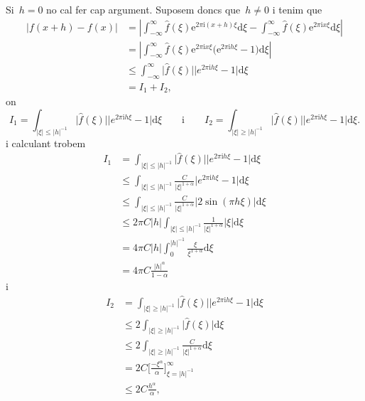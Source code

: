 \documentclass[a4paper]{article}
\theoremstyle{definition}
\newcommand{\iu}{\mathrm{i}}
\newcommand{\e}{\mathrm{e}}
\newcommand{\uppi}{\pi}
\newcommand{\diff}{\mathrm{d}}
\newcommand{\abs}[1]{\lvert{#1}\rvert}
\newcommand{\Abs}[1]{\left\lvert{#1}\right\rvert}
\begin{document}
Si~\(h=0\) no cal fer cap argument.
Suposem doncs que~\(h\neq0\) i tenim que
\begin{align*}
    \abs{f(x+h) - f(x)} &= \Abs{\int_{-\infty}^{\infty}
                           \widehat{f}(\xi)\e^{2\uppi\iu(x+h)\xi}\diff\xi
                         - \int_{-\infty}^{\infty}
                           \widehat{f}(\xi)\e^{2\uppi\iu x\xi}\diff\xi} \\
                        &= \Abs{\int_{-\infty}^{\infty}
                           \widehat{f}(\xi)\e^{2\uppi\iu x\xi}
                           \bigl(\e^{2\uppi\iu h\xi}-1\bigr)
                           \diff\xi} \\
                        &\leq \int_{-\infty}^{\infty}
                           \abs{\widehat{f}(\xi)}\abs{e^{2\uppi\iu h\xi}-1}
                           \diff\xi \\
                        &= I_{1} + I_{2},
\end{align*}
on
\[
    I_{1} = \int_{\abs{\xi}\leq\abs{h}^{-1}}
    \abs{\widehat{f}(\xi)}\abs{e^{2\uppi\iu h\xi}-1} \diff\xi
    \qquad\text{i}\qquad
    I_{2} = \int_{\abs{\xi}\geq\abs{h}^{-1}}
    \abs{\widehat{f}(\xi)}\abs{e^{2\uppi\iu h\xi}-1} \diff\xi.
\]
i calculant trobem
\begin{align*}
    I_{1} &= \int_{\abs{\xi}\leq\abs{h}^{-1}}
             \abs{\widehat{f}(\xi)}\abs{e^{2\uppi\iu h\xi}-1}
             \diff\xi \\
          &\leq \int_{\abs{\xi}\leq\abs{h}^{-1}}
             \frac{C}{\abs{\xi}^{1+\alpha}}
             \abs{e^{2\uppi\iu h\xi}-1}
             \diff\xi \\
          &\leq \int_{\abs{\xi}\leq\abs{h}^{-1}}
             \frac{C}{\abs{\xi}^{1+\alpha}}
             \abs{2\sin(\uppi h\xi)}
             \diff\xi \\
          &\leq 2\uppi C\abs{h}
             \int_{\abs{\xi}\leq\abs{h}^{-1}}
             \frac{1}{\abs{\xi}^{1+\alpha}}\abs{\xi}
             \diff\xi \\
          &= 4\uppi C\abs{h}
             \int_{0}^{\abs{h}^{-1}}
             \frac{\xi}{\xi^{1+\alpha}}
             \diff\xi \\
          &= 4\uppi C\frac{\abs{h}^{\alpha}}{1-\alpha}
\end{align*}
i
\begin{align*}
    I_{2} &= \int_{\abs{\xi}\geq\abs{h}^{-1}}
             \abs{\widehat{f}(\xi)}\abs{e^{2\uppi\iu h\xi}-1}
             \diff\xi \\
          &\leq 2\int_{\abs{\xi}\geq\abs{h}^{-1}}
                \abs{\widehat{f}(\xi)}\diff\xi \\
          &\leq 2\int_{\abs{\xi}\geq\abs{h}^{-1}}
                \frac{C}{\abs{\xi}^{1+\alpha}} \diff\xi \\
          &= 2C
          \biggl[\frac{-\xi^{\alpha}}{\alpha}\biggr]_{\xi=\abs{h}^{-1}}^{\infty} \\
          &\leq 2C\frac{h^{\alpha}}{\alpha},
\end{align*}
\end{document}
